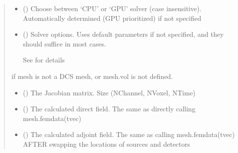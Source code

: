 \documentclass[letterpaper,10pt,english]{sphinxmanual}
\begin{document}
\begin{fulllineitems}
\begin{quote}
\begin{description}
\begin{itemize}
\item {} 
\sphinxAtStartPar
{} (\sphinxstyleliteralemphasis{\sphinxupquote{, }}) \textendash{} Choose between ‘CPU’ or ‘GPU’ solver (case insensitive). Automatically determined (GPU prioritized) if not specified

\item {} 
\sphinxAtStartPar
{} ({\hyperref[\detokenize{_autosummary/nirfasterff.utils.SolverOptions:nirfasterff.utils.SolverOptions}]{}}\sphinxstyleliteralemphasis{\sphinxupquote{, }}) \textendash{} 
\sphinxAtStartPar
Solver options. Uses default parameters if not specified, and they should suffice in most cases.

\sphinxAtStartPar
See {\hyperref[\detokenize{_autosummary/nirfasterff.utils.SolverOptions:nirfasterff.utils.SolverOptions}]{}} for details


\end{itemize}

\sphinxAtStartPar
{} \textendash{} if mesh is not a DCS mesh, or mesh.vol is not defined.

\sphinxAtStartPar
\begin{itemize}
\item {} 
\sphinxAtStartPar
{} () \textendash{} The Jacobian matrix. Size (NChannel, NVoxel, NTime)

\item {} 
\sphinxAtStartPar
{} () \textendash{} The calculated direct field. The same as directly calling mesh.femdata(tvec)

\item {} 
\sphinxAtStartPar
{} () \textendash{} The calculated adjoint field. The same as calling mesh.femdata(tvec) AFTER swapping the locations of sources and detectors

\end{itemize}


\end{description}\end{quote}

\end{fulllineitems}
\end{document}
